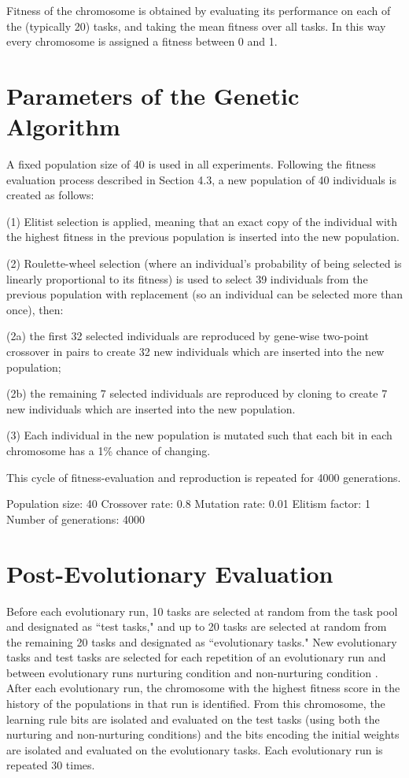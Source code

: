 \documentclass[master]{outhesis}
\begin{document}
Fitness of the chromosome is obtained by evaluating its performance on each of the (typically 20) tasks, and taking the mean fitness over all tasks. In this way every chromosome is assigned a fitness between 0 and 1.

\section{Parameters of the Genetic Algorithm}


A fixed population size of 40 is used in all experiments. Following the fitness evaluation process described in Section 4.3, a new population of 40 individuals is created as follows:

(1) Elitist selection is applied, meaning that an exact copy of the individual with the highest fitness in the previous population is inserted into the new population.

(2) Roulette-wheel selection (where an individual's probability of being selected is linearly proportional to its fitness) is used to select 39 individuals from the previous population with replacement (so an individual can be selected more than once), then:

(2a) the first 32 selected individuals are reproduced by gene-wise two-point crossover in pairs to create 32 new individuals which are inserted into the new population;

(2b) the remaining 7 selected individuals are reproduced by cloning to create 7 new individuals which are inserted into the new population.

(3) Each individual in the new population is mutated such that each bit in each chromosome has a 1\% chance of changing.

This cycle of fitness-evaluation and reproduction is repeated for 4000 generations.

Population size: 40
Crossover rate: 0.8
Mutation rate: 0.01
Elitism factor: 1
Number of generations: 4000

\section{Post-Evolutionary Evaluation}

Before each evolutionary run, 10 tasks are selected at random from the task pool and designated as ``test tasks,"
and up to 20 tasks are selected at random from the remaining 20 tasks and designated as ``evolutionary tasks."
New evolutionary tasks and test tasks are selected for each repetition of an evolutionary run and between evolutionary runs  nurturing condition and non-nurturing condition .
After each evolutionary run, the chromosome with the highest fitness score in the history of the populations in that run is identified.
From this chromosome, the learning rule bits are isolated and evaluated on the test tasks (using both the nurturing and non-nurturing conditions) and the bits encoding the initial weights are isolated and evaluated on the evolutionary tasks.
Each evolutionary run is repeated 30 times.
\end{document}
